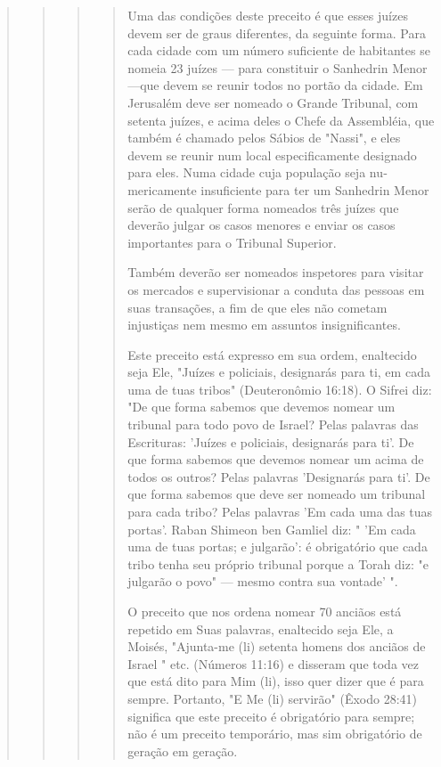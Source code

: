 \begin{quote}
\begin{quote}
\begin{quote}
\begin{quote}
Uma das condições deste preceito é que esses juízes devem ser de graus
diferentes, da seguinte forma. Para cada cidade com um número
suficien­te de habitantes se nomeia 23 juízes --- para constituir o
Sanhedrin Menor ---que devem se reunir todos no portão da cidade. Em
Jerusalém deve ser nomea­do o Grande Tribunal, com setenta juízes, e
acima deles o Chefe da Assembléia, que também é chamado pelos Sábios de
"Nassi", e eles devem se reunir num local especificamente designado para
eles. Numa cidade cuja população seja nu­mericamente insuficiente para
ter um Sanhedrin Menor serão de qualquer for­ma nomeados três juízes que
deverão julgar os casos menores e enviar os casos importantes para o
Tribunal Superior.

Também deverão ser nomeados inspetores para visitar os mercados e
supervisionar a conduta das pessoas em suas transações, a fim de que
eles não cometam injustiças nem mesmo em assuntos insignificantes.

Este preceito está expresso em sua ordem, enaltecido seja Ele, "Juí­zes
e policiais, designarás para ti, em cada uma de tuas tribos"
(Deuteronômio 16:18). O Sifrei diz: "De que forma sabemos que devemos
nomear um tribunal para todo povo de Israel? Pelas palavras das
Escrituras: 'Juízes e policiais, desig­narás para ti'. De que forma
sabemos que devemos nomear um acima de todos 
os outros? Pelas palavras 'Designarás para ti'. De que forma sabemos
que deve ser nomeado um tribunal para cada tribo? Pelas palavras 'Em
cada uma das tuas portas'. Raban Shimeon ben Gamliel diz: " 'Em cada uma
de tuas por­tas; e julgarão': é obrigatório que cada tribo tenha seu
próprio tribunal porque a Torah diz: "e julgarão o povo" --- mesmo
contra sua vontade' ".

O preceito que nos ordena nomear 70 anciãos está repetido em Suas
palavras, enaltecido seja Ele, a Moisés, "Ajunta-me (li) setenta homens
dos an­ciãos de Israel " etc. (Números 11:16) e disseram que toda vez
que está dito para Mim (li), isso quer dizer que é para sempre.
Portanto, "E Me (li) servirão" (Êxodo 28:41) significa que este preceito
é obrigatório para sempre; não é um preceito temporário, mas sim
obrigatório de geração em geração.


\end{quote}
\end{quote}
\end{quote}
\end{quote}
